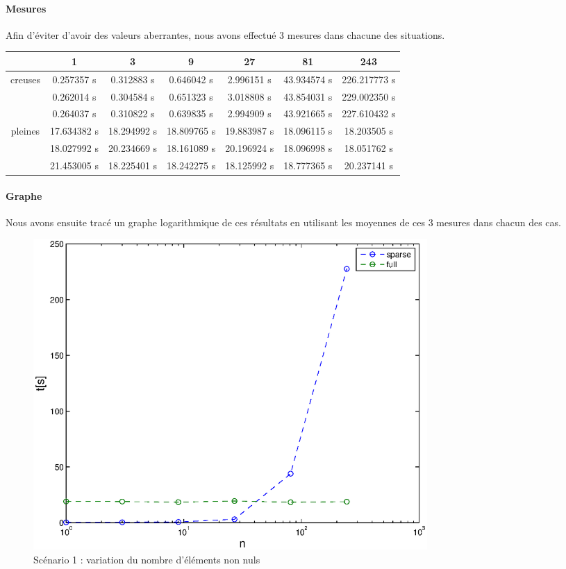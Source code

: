 \documentclass[12pt,a4paper]{article}
\begin{document}
\paragraph{Mesures}
Afin d'éviter d'avoir des valeurs aberrantes, nous avons effectué 3 mesures dans chacune des situations. \\

\begin{tabular}{|*{7}{c|}}
    \hline
       & 1  & 3  & 9  & 27  & 81  & 243 \\
    \hline
    \multirow{3}{*}{creuses}  & 0.257357 s & 0.312883 s & 0.646042 s & 2.996151 s & 43.934574 s & 226.217773 s\\
    & 0.262014 s & 0.304584 s & 0.651323 s & 3.018808 s & 43.854031 s & 229.002350 s\\
    & 0.264037 s & 0.310822 s & 0.639835 s & 2.994909 s & 43.921665 s & 227.610432 s\\
    \hline
     \multirow{3}{*}{pleines} & 17.634382 s & 18.294992 s & 18.809765 s  & 19.883987 s & 18.096115 s & 18.203505 s\\
    & 18.027992 s & 20.234669 s & 18.161089 s & 20.196924 s & 18.096998 s & 18.051762 s\\
    & 21.453005 s & 18.225401 s & 18.242275 s & 18.125992 s & 18.777365 s & 20.237141 s\\
    \hline
\end{tabular}


\paragraph{Graphe}
Nous avons ensuite tracé un graphe logarithmique de ces résultats en utilisant les moyennes de ces 3 mesures dans chacun des cas.
\begin{figure}[!h]
	\begin{center}
		\includegraphics[width=15cm]{taillecst.eps}
		\caption{Scénario 1 : variation du nombre d'éléments non nuls}
		\label{vnz}
	\end{center}
\end{figure}
\end{document}
